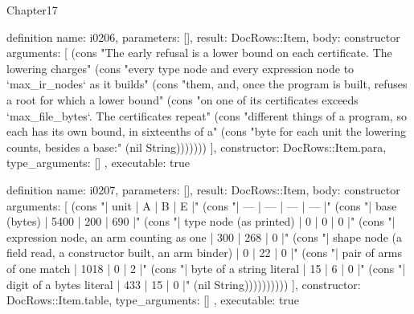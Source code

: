 \begin{lexlean}{Chapter17}
\begin{semanticmodule}
definition{
  name: i0206,
  parameters: [],
  result: DocRows::Item,
  body: constructor{
    arguments: [
      (cons "The early refusal is a lower bound on each certificate. The lowering charges" (cons "every type node and every expression node to `max_ir_nodes` as it builds" (cons "them, and, once the program is built, refuses a root for which a lower bound" (cons "on one of its certificates exceeds `max_file_bytes`. The certificates repeat" (cons "different things of a program, so each has its own bound, in sixteenths of a" (cons "byte for each unit the lowering counts, besides a base:" (nil String)))))))
    ],
    constructor: DocRows::Item.para,
    type_arguments: []
  },
  executable: true
}

definition{
  name: i0207,
  parameters: [],
  result: DocRows::Item,
  body: constructor{
    arguments: [
      (cons "| unit | A | B | E |" (cons "| --- | --- | --- | --- |" (cons "| base (bytes) | 5400 | 200 | 690 |" (cons "| type node (as printed) | 0 | 0 | 0 |" (cons "| expression node, an arm counting as one | 300 | 268 | 0 |" (cons "| shape node (a field read, a constructor built, an arm binder) | 0 | 22 | 0 |" (cons "| pair of arms of one match | 1018 | 0 | 2 |" (cons "| byte of a string literal | 15 | 6 | 0 |" (cons "| digit of a bytes literal | 433 | 15 | 0 |" (nil String))))))))))
    ],
    constructor: DocRows::Item.table,
    type_arguments: []
  },
  executable: true
}


\end{semanticmodule}
\end{lexlean}
